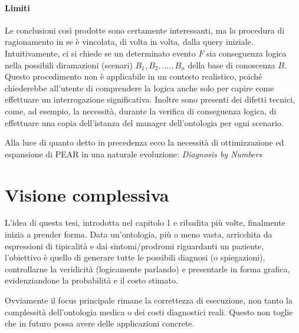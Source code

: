\paragraph{Limiti}
Le conclusioni così prodotte sono certamente interessanti, ma la procedura di ragionamento in se è vincolata, di volta
in volta, dalla query iniziale. \\Intuitivamente, ci si chiede se un determinato evento $ F $ sia 
conseguenza logica nella possibili diramazioni (scenari) $ B_1,B_2,....,B_n $ della base di conoscenza $ B $.
Questo procedimento non è applicabile in un contesto realistico, poiché chiederebbe all'utente di comprendere
la logica anche solo per capire come effettuare un interrogazione significativa.
Inoltre sono presenti dei difetti tecnici, come, ad esempio, la necessità, durante la verifica di
conseguenza logica, di effettuare una copia dell'istanza del manager dell'ontologia per ogni scenario.

Alla luce di quanto detto in precedenza ecco la necessità di ottimizzazione ed espansione di PEAR in 
una naturale evoluzione: \textsl{Diagnosis by Numbers}

\section{Visione complessiva}
L'idea di questa tesi, introdotta nel capitolo 1 e ribadita più volte, finalmente inizia a prender forma.
Data un'ontologia, più o meno vasta, arricchita da espressioni di tipicalità e dai sintomi/prodromi
riguardanti un paziente, l'obiettivo è quello di generare tutte le possibili diagnosi (o spiegazioni),
controllarne la veridicità (logicamente parlando) e presentarle in forma grafica, evidenziandone la 
probabilità e il costo stimato.

Ovviamente il focus principale rimane la correttezza di esecuzione, non tanto la complessità dell'ontologia
medica o dei costi diagnostici reali. Questo non toglie che in futuro possa avere delle applicazioni concrete.

